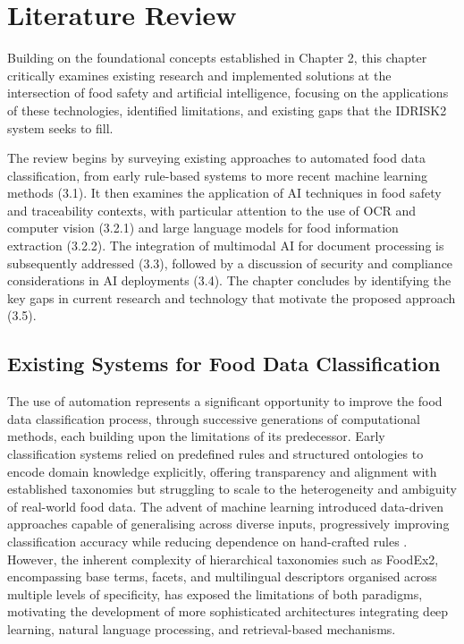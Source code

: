 \hypertarget{literature-review}{%
\chapter{Literature Review}\label{literature-review}}

Building on the foundational concepts established in Chapter 2, this chapter critically examines existing research and implemented solutions at the intersection of food safety and artificial intelligence, focusing on the applications of these technologies, identified limitations, and existing gaps that the IDRISK2 system seeks to fill.

The review begins by surveying existing approaches to automated food data classification, from early rule-based systems to more recent machine learning methods (3.1). It then examines the application of AI techniques in food safety and traceability contexts, with particular attention to the use of OCR and computer vision (3.2.1) and large language models for food information extraction (3.2.2). The integration of multimodal AI for document processing is subsequently addressed (3.3), followed by a discussion of security and compliance considerations in AI deployments (3.4). The chapter concludes by identifying the key gaps in current research and technology that motivate the proposed approach (3.5).

\hypertarget{existing-systems-for-food-data-classification}{%
\section{Existing Systems for Food Data Classification}\label{existing-systems-for-food-data-classification}}

The use of automation represents a significant opportunity to improve the food data classification process, through successive generations of computational methods, each building upon the limitations of its predecessor. Early classification systems relied on predefined rules and structured ontologies to encode domain knowledge explicitly, offering transparency and alignment with established taxonomies but struggling to scale to the heterogeneity and ambiguity of real-world food data. The advent of machine learning introduced data-driven approaches capable of generalising across diverse inputs, progressively improving classification accuracy while reducing dependence on hand-crafted rules \parencite{_17165083__simon_pearson_76a456af,van_meer__floor_f66672e5}. However, the inherent complexity of hierarchical taxonomies such as FoodEx2, encompassing base terms, facets, and multilingual descriptors organised across multiple levels of specificity, has exposed the limitations of both paradigms, motivating the development of more sophisticated architectures integrating deep learning, natural language processing, and retrieval-based mechanisms.

